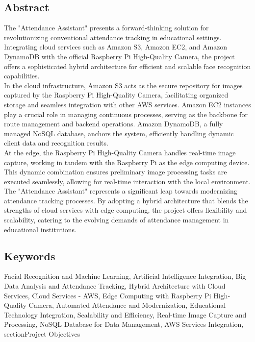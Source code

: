 \documentclass[11pt]{article}
\begin{document}
\setcounter{page}{1}
\begin{multicols}{2}

\section{Abstract}
The "Attendance Assistant" presents a forward-thinking solution for revolutionizing conventional attendance tracking in educational settings. Integrating cloud services such as Amazon S3, Amazon EC2, and Amazon DynamoDB with the official Raspberry Pi High-Quality Camera, the project offers a sophisticated hybrid architecture for efficient and scalable face recognition capabilities.\\

In the cloud infrastructure, Amazon S3 acts as the secure repository for images captured by the Raspberry Pi High-Quality Camera, facilitating organized storage and seamless integration with other AWS services. Amazon EC2 instances play a crucial role in managing continuous processes, serving as the backbone for route management and backend operations. Amazon DynamoDB, a fully managed NoSQL database, anchors the system, efficiently handling dynamic client data and recognition results.\\

At the edge, the Raspberry Pi High-Quality Camera handles real-time image capture, working in tandem with the Raspberry Pi as the edge computing device. This dynamic combination ensures preliminary image processing tasks are executed seamlessly, allowing for real-time interaction with the local environment.\\

The "Attendance Assistant" represents a significant leap towards modernizing attendance tracking processes. By adopting a hybrid architecture that blends the strengths of cloud services with edge computing, the project offers flexibility and scalability, catering to the evolving demands of attendance management in educational institutions.

\subsection*{Keywords}
Facial Recognition and Machine Learning, Artificial Intelligence Integration, Big Data Analysis and Attendance Tracking, Hybrid Architecture with Cloud Services, Cloud Services - AWS, Edge Computing with Raspberry Pi High-Quality Camera, Automated Attendance and Modernization, Educational Technology Integration, Scalability and Efficiency, Real-time Image Capture and Processing, NoSQL Database for Data Management, AWS Services Integration, section{Project Objectives}


\end{multicols}
\end{document}
